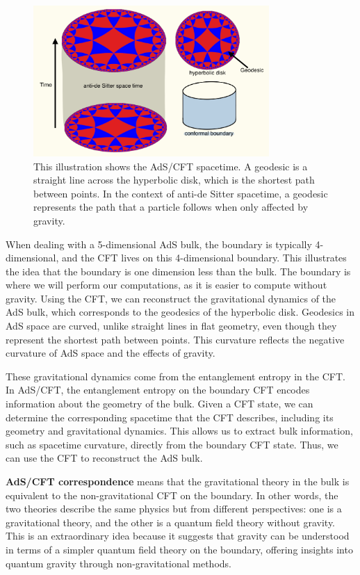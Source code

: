 \documentclass[12pt]{article}
\begin{document}
        \begin{figure}[htbp]
            \centering
            \includegraphics[width=0.8\textwidth]{ads_cft.jpeg}  
            \caption{This illustration shows the AdS/CFT spacetime. A geodesic is a straight line across the hyperbolic disk, which is the shortest path between points. In the context of anti-de Sitter spacetime, a geodesic represents the path that a particle follows when only affected by gravity.}  
            \label{fig:AdS/CFT space}  
        \end{figure}

        \newpage
        When dealing with a 5-dimensional AdS bulk, the boundary is typically 4-dimensional, and the CFT lives on this 4-dimensional boundary. This illustrates the idea that the boundary is one dimension less than the bulk. The boundary is where we will perform our computations, as it is easier to compute without gravity. Using the CFT, we can reconstruct the gravitational dynamics of the AdS bulk, which corresponds to the geodesics of the hyperbolic disk. Geodesics in AdS space are curved, unlike straight lines in flat geometry, even though they represent the shortest path between points. This curvature reflects the negative curvature of AdS space and the effects of gravity.

        These gravitational dynamics come from the entanglement entropy in the CFT. In AdS/CFT, the entanglement entropy on the boundary CFT encodes information about the geometry of the bulk. Given a CFT state, we can determine the corresponding spacetime that the CFT describes, including its geometry and gravitational dynamics. This allows us to extract bulk information, such as spacetime curvature, directly from the boundary CFT state. Thus, we can use the CFT to reconstruct the AdS bulk.

        \textbf{AdS/CFT correspondence} means that the gravitational theory in the bulk is equivalent to the non-gravitational CFT on the boundary. In other words, the two theories describe the same physics but from different perspectives: one is a gravitational theory, and the other is a quantum field theory without gravity. This is an extraordinary idea because it suggests that gravity can be understood in terms of a simpler quantum field theory on the boundary, offering insights into quantum gravity through non-gravitational methods.
\end{document}
